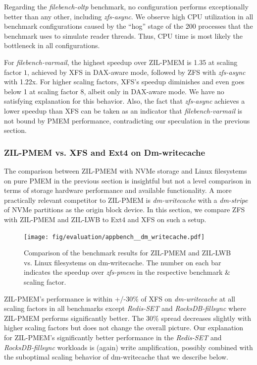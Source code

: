 \documentclass[12pt,a4paper,twoside]{book}
\begin{document}
{Regarding the \textit{filebench-oltp} benchmark, no configuration performs exceptionally better than any other, including \textit{zfs-async}.
We observe high CPU utilization in all benchmark configurations caused by the ``hog'' stage of the 200 processes that the benchmark uses to simulate reader threads.
Thus, CPU time is most likely the bottleneck in all configurations.

For \textit{filebench-varmail}, the highest speedup over ZIL-PMEM is 1.35 at scaling factor $1$, achieved by XFS in DAX-aware mode, followed by ZFS with \textit{zfs-async} with 1.22x.
For higher scaling factors, XFS's speedup diminishes and even goes below 1 at scaling factor $8$, albeit only in DAX-aware mode.
We have no satisfying explanation for this behavior.
Also, the fact that \textit{zfs-async} achieves a lower speedup than XFS can be taken as an indicator that \textit{filebench-varmail} is not bound by PMEM performance, contradicting our speculation in the previous section.

\subsubsection{ZIL-PMEM vs. XFS and Ext4 on Dm-writecache}\label{sec:eval:dmwritecache}

The comparison between ZIL-PMEM with NVMe storage and Linux filesystems on pure PMEM in the previous section is insightful but not a level comparison in terms of storage hardware performance and available functionality.
A more practically relevant competitor to ZIL-PMEM is \textit{dm-writecache} with a \textit{dm-stripe} of NVMe partitions as the origin block device.
In this section, we compare ZFS with ZIL-PMEM and ZIL-LWB to Ext4 and XFS on such a setup.

\begin{figure}[H]
    \centering
    \texttt{[image: fig/evaluation/appbench\_\_dm\_writecache.pdf]}
    \caption{
        Comparison of the benchmark results for ZIL-PMEM and ZIL-LWB vs. Linux filesystems on dm-writecache.
        The number on each bar indicates the speedup over \textit{zfs-pmem} in the respective benchmark \& scaling factor.
    }
\end{figure}

ZIL-PMEM's performance is within +/-30\% of XFS on \textit{dm-writecache} at all scaling factors in all benchmarks except \textit{Redis-SET} and \textit{RocksDB-fillsync} where ZIL-PMEM performs significantly better.
The 30\% spread decreases slightly with higher scaling factors but does not change the overall picture.
Our explanation for ZIL-PMEM's significantly better performance in the \textit{Redis-SET} and \textit{RocksDB-fillsync} workloads is (again) write amplification, possibly combined with the suboptimal scaling behavior of dm-writecache that we describe below.

}
\end{document}
